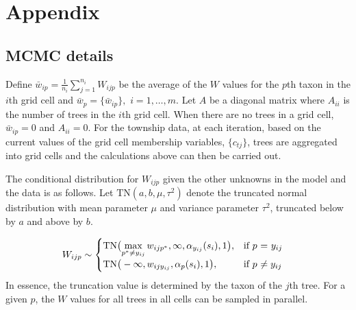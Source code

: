 \documentclass[12pt]{article}
\begin{document}
% 


\section{Appendix}


\subsection{MCMC details}

Define $\bar{w}_{ip}=\frac{1}{n_{i}}{\displaystyle \sum_{j=1}^{n_{i}}W_{ijp}}$
be the average of the $W$ values for the $p$th taxon in the $i$th
grid cell and $\bar{w}_{p}=\{\bar{w}_{ip}\},$ $i=1,\ldots,m$. Let
$A$ be a diagonal matrix where $A_{ii}$ is the number of trees in
the $i$th grid cell. When there are no trees in a grid cell, $\bar{w}_{ip}=0$
and $A_{ii}=0$. For the township data, at each iteration, based on
the current values of the grid cell membership variables, $\{c_{tj}\}$,
trees are aggregated into grid cells and the calculations above can
then be carried out.

The conditional distribution for $W_{ijp}$ given the other unknowns
in the model and the data is as follows. Let $\mbox{TN}(a,b,\mu,\tau^{2})$
denote the truncated normal distribution with mean parameter $\mu$
and variance parameter $\tau^{2}$, truncated below by $a$ and above
by $b$. 

\begin{align}
W_{ijp} & \sim\begin{cases}
\mbox{TN}\big({\displaystyle \max_{p^{*}\neq y_{ij}}w_{ijp^{*}},\infty,\alpha_{y_{ij}}(s_{i}),1\big),} & \mbox{if }p\mbox{ = \ensuremath{y_{ij}}}\\
\mbox{TN}\big(-\infty,w_{ijy_{ij}},\alpha_{p}(s_{i}),1\big), & \mbox{if }p\mbox{ \ensuremath{\neq y_{ij}}}
\end{cases}\label{sampW}
\end{align}
In essence, the truncation value is determined by the taxon of the
$j$th tree. For a given $p$, the $W$ values for all trees in all
cells can be sampled in parallel. 
\end{document}
